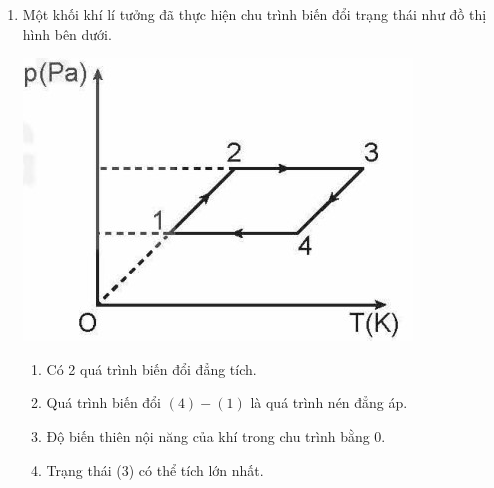 \begin{enumerate}[label=\bfseries Câu \arabic*:, leftmargin=1.7cm]
\item Một khối khí lí tưởng đã thực hiện chu trình biến đổi trạng thái như đồ thị hình bên dưới.
\begin{center}
	\includegraphics[width=0.4\linewidth]{../figs/VN12-Y24-PH-SYL-016-4}
\end{center}
\begin{enumerate}[label=\alph*)]
	\item Có 2 quá trình biến đổi đẳng tích.
	\item Quá trình biến đổi $(4) - (1)$ là quá trình nén đẳng áp.
	\item Độ biến thiên nội năng của khí trong chu trình bằng 0.
	\item Trạng thái (3) có thể tích lớn nhất.
\end{enumerate}


\end{enumerate}
